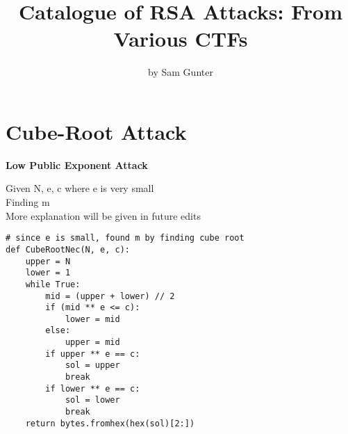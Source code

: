 \documentclass[11pt,notitlepage]{report}
\makeatletter
\newcommand*{\toccontents}{\@starttoc{toc}}
\makeatother
\begin{document}
\parindent=0pt

\title{\vspace{-15mm}Catalogue of RSA Attacks: From Various CTFs\vspace{-5mm}}
\author{by Sam Gunter}
\date{}
\maketitle

\toccontents

\thispagestyle{empty}
\newpage
\setcounter{page}{1}

\section{Cube-Root Attack}
\vspace{-5mm}
\textbf{Low Public Exponent Attack}

Given N, e, c where e is very small\\
Finding m\\

More explanation will be given in future edits

\begin{verbatim}
# since e is small, found m by finding cube root
def CubeRootNec(N, e, c):
    upper = N
    lower = 1
    while True:
        mid = (upper + lower) // 2
        if (mid ** e <= c):
            lower = mid
        else:
            upper = mid
        if upper ** e == c:
            sol = upper
            break
        if lower ** e == c:
            sol = lower
            break
    return bytes.fromhex(hex(sol)[2:])
\end{verbatim}
\end{document}
